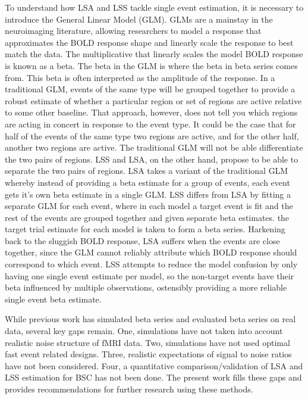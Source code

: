 \documentclass[10pt,letterpaper]{article}
\begin{document}
To understand how LSA and LSS tackle single event estimation, it is necessary to introduce
the General Linear Model (GLM).
GLMs are a mainstay in the neuroimaging literature, allowing researchers to model
a response that approximates the BOLD response shape and linearly scale the response
to best match the data.
The multiplicative that linearly scales the model BOLD response is known as a beta.
The beta in the GLM is where the beta in beta series comes from.
This beta is often interpreted as the amplitude of the response.
In a traditional GLM, events of the same type will be grouped together
to provide a robust estimate of whether a particular region or set of regions are
active relative to some other baseline.
That approach, however, does not tell you which regions are acting in concert
in response to the event type.
It could be the case that for half of the events of the same type two regions are active,
and for the other half, another two regions are active.
The traditional GLM will not be able differentiate the two pairs of regions.
LSS and LSA, on the other hand, propose to be able to separate the two pairs of regions.
LSA takes a variant of the traditional GLM whereby instead of providing a beta
estimate for a group of events, each event gets it's own beta estimate in a single GLM.
LSS differs from LSA by fitting a separate GLM for each event, where in each model a target
event is fit and the rest of the events are grouped together and given separate beta estimates.
the target trial estimate for each model is taken to form a beta series.
Harkening back to the sluggish BOLD response, LSA suffers when the events are close together,
since the GLM cannot reliably attribute which BOLD response should correspond to which event.
LSS attempts to reduce the model confusion by only having one single event estimate per model,
so the non-target events have their beta influenced by multiple observations, ostensibly
providing a more reliable single event beta estimate.

While previous work has simulated beta series and evaluated beta series on real data,
several key gaps remain.
One, simulations have not taken into account realistic noise structure of fMRI data.
Two, simulations have not used optimal fast event related designs.
Three, realistic expectations of signal to noise ratios have not been considered.
Four, a quantitative comparison/validation of LSA and LSS estimation for BSC has not been done.
The present work fills these gaps and provides recommendations for further research
using these methods.
\end{document}

